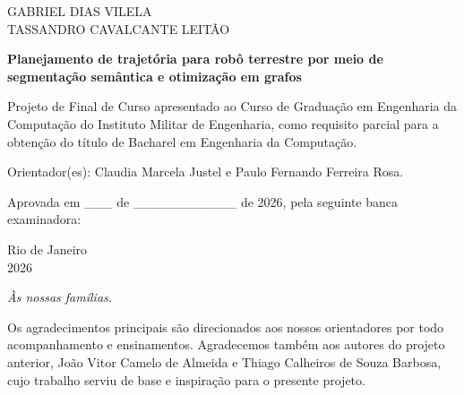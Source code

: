 \documentclass[
    12pt,
    openright,
    oneside,
    a4paper,
    english,
    brazil
]{abntex2}
\begin{document}
\begin{folhadeaprovacao}
    \center

    {\large GABRIEL DIAS VILELA}\\
    {\large TASSANDRO CAVALCANTE LEITÃO}

    \vspace{1cm}

    {\large\bfseries Planejamento de trajetória para robô terrestre por meio de segmentação semântica e otimização em grafos}

    \vspace{1cm}

    Projeto de Final de Curso apresentado ao Curso de Graduação em Engenharia da Computação do Instituto Militar de Engenharia, como requisito parcial para a obtenção do título de Bacharel em Engenharia da Computação.

    \vspace{0.5cm}

    Orientador(es): Claudia Marcela Justel e Paulo Fernando Ferreira Rosa.

    \vspace{0.5cm}

    Aprovada em \_\_\_ de \_\_\_\_\_\_\_\_\_\_\_ de 2026, pela seguinte banca examinadora:

    \vspace{1.5cm}


    \vfill

    {\large Rio de Janeiro}\\
    {\large 2026}
\end{folhadeaprovacao}

\begin{dedicatoria}
    \vspace*{\fill}
    \centering
    \noindent
    \textit{Às nossas famílias.}
    \vspace*{\fill}
\end{dedicatoria}

\begin{agradecimentos}
Os agradecimentos principais são direcionados aos nossos orientadores por todo acompanhamento e ensinamentos. Agradecemos também aos autores do projeto anterior, João Vitor Camelo de Almeida e Thiago Calheiros de Souza Barbosa, cujo trabalho serviu de base e inspiração para o presente projeto.
\end{agradecimentos}
\end{document}
